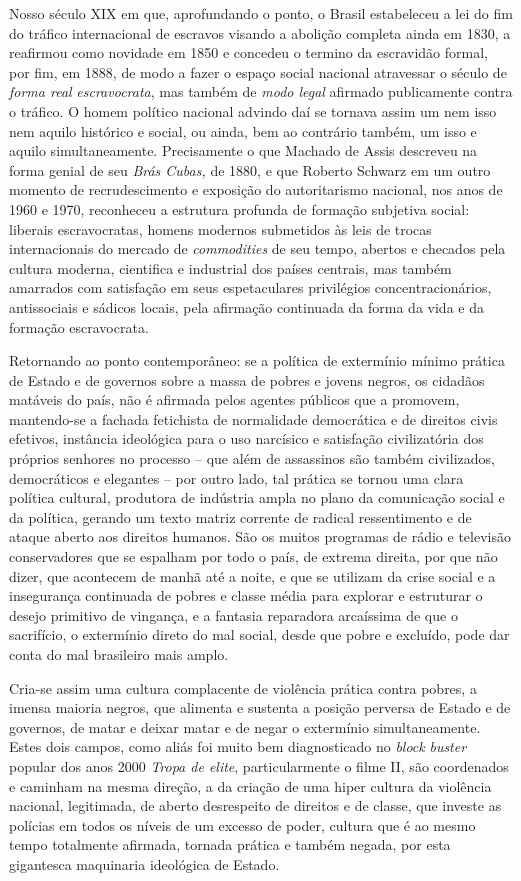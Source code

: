 Nosso século XIX em que, aprofundando o ponto, o Brasil estabeleceu a
lei do fim do tráfico internacional de escravos visando a abolição
completa ainda em 1830, a reafirmou como novidade em 1850 e concedeu o
termino da escravidão formal, por fim, em 1888, de modo a fazer o espaço
social nacional atravessar o século de \emph{forma real}
\emph{escravocrata}, mas também de \emph{modo legal} afirmado
publicamente contra o tráfico. O homem político nacional advindo daí se
tornava assim um nem isso nem aquilo histórico e social, ou ainda, bem
ao contrário também, um isso e aquilo simultaneamente. Precisamente o
que Machado de Assis descreveu na forma genial de seu \emph{Brás Cubas,}
de 1880, e que Roberto Schwarz em um outro momento de recrudescimento e
exposição do autoritarismo nacional, nos anos de 1960 e 1970, reconheceu
a estrutura profunda de formação subjetiva social: liberais
escravocratas, homens modernos submetidos às leis de trocas
internacionais do mercado de \emph{commodities} de seu tempo, abertos e
checados pela cultura moderna, cientifica e industrial dos países
centrais, mas também amarrados com satisfação em seus espetaculares
privilégios concentracionários, antissociais e sádicos locais, pela
afirmação continuada da forma da vida e da formação escravocrata.

Retornando ao ponto contemporâneo: se a política de extermínio mínimo
prática de Estado e de governos sobre a massa de pobres e jovens negros,
os cidadãos matáveis do país, não é afirmada pelos agentes públicos que
a promovem, mantendo-se a fachada fetichista de normalidade democrática
e de direitos civis efetivos, instância ideológica para o uso narcísico
e satisfação civilizatória dos próprios senhores no processo -- que além
de assassinos são também civilizados, democráticos e elegantes -- por
outro lado, tal prática se tornou uma clara política cultural, produtora
de indústria ampla no plano da comunicação social e da política, gerando
um texto matriz corrente de radical ressentimento e de ataque aberto aos
direitos humanos. São os muitos programas de rádio e televisão
conservadores que se espalham por todo o país, de extrema direita, por
que não dizer, que acontecem de manhã até a noite, e que se utilizam da
crise social e a insegurança continuada de pobres e classe média para
explorar e estruturar o desejo primitivo de vingança, e a fantasia
reparadora arcaíssima de que o sacrifício, o extermínio direto do mal
social, desde que pobre e excluído, pode dar conta do mal brasileiro
mais amplo.

Cria-se assim uma cultura complacente de violência prática contra
pobres, a imensa maioria negros, que alimenta e sustenta a posição
perversa de Estado e de governos, de matar e deixar matar e de negar o
extermínio simultaneamente. Estes dois campos, como aliás foi muito bem
diagnosticado no \emph{block} \emph{buster} popular dos anos 2000
\emph{Tropa de elite}, particularmente o filme II, são coordenados e
caminham na mesma direção, a da criação de uma hiper cultura da
violência nacional, legitimada, de aberto desrespeito de direitos e de
classe, que investe as polícias em todos os níveis de um excesso de
poder, cultura que é ao mesmo tempo totalmente afirmada, tornada prática
e também negada, por esta gigantesca maquinaria ideológica de Estado.

